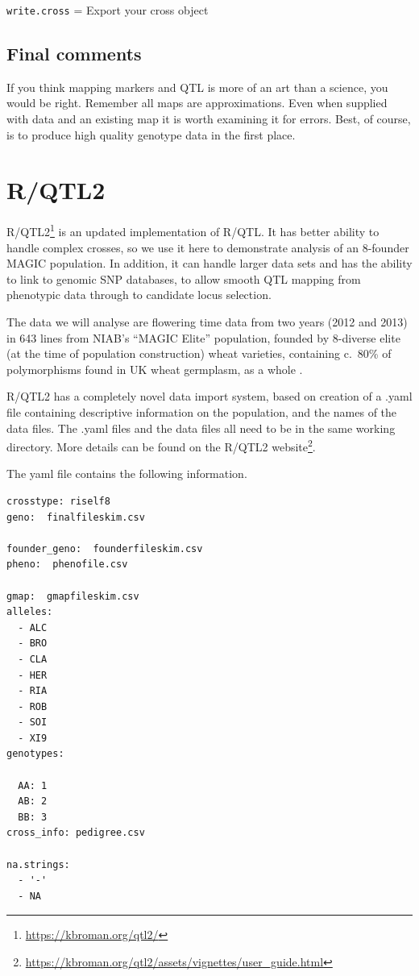 \documentclass[
]{book}
\renewcommand{\href}[2]{#2\footnote{\url{#1}}}
\begin{document}
\texttt{write.cross} = Export your cross object

\hypertarget{final-comments}{%
\subsection{Final comments}\label{final-comments}}

If you think mapping markers and QTL is more of an art than a science, you would be right. Remember all maps are approximations. Even when supplied with data and an existing map it is worth examining it for errors. Best, of course, is to produce high quality genotype data in the first place.

\hypertarget{rqtl2}{%
\section{R/QTL2}\label{rqtl2}}

\href{https://kbroman.org/qtl2/}{R/QTL2} is an updated implementation of R/QTL. It has better ability to handle complex crosses, so we use it here to demonstrate analysis of an 8-founder MAGIC population. In addition, it can handle larger data sets and has the ability to link to genomic SNP databases, to allow smooth QTL mapping from phenotypic data through to candidate locus selection.

The data we will analyse are flowering time data from two years (2012 and 2013) in 643 lines from NIAB's ``MAGIC Elite'' population, founded by 8-diverse elite (at the time of population construction) wheat varieties, containing c.~80\% of polymorphisms found in UK wheat germplasm, as a whole \citep{Gardner_2016}.

R/QTL2 has a completely novel data import system, based on creation of a .yaml file containing descriptive information on the population, and the names of the data files. The .yaml files and the data files all need to be in the same working directory. More details can be found on the R/QTL2 \href{https://kbroman.org/qtl2/assets/vignettes/user_guide.html}{website}.

The yaml file contains the following information.

\begin{verbatim}
crosstype: riself8      
geno:  finalfileskim.csv

founder_geno:  founderfileskim.csv
pheno:  phenofile.csv

gmap:  gmapfileskim.csv
alleles:
  - ALC
  - BRO
  - CLA
  - HER
  - RIA
  - ROB
  - SOI
  - XI9
genotypes:

  AA: 1
  AB: 2
  BB: 3
cross_info: pedigree.csv

na.strings:
  - '-'
  - NA
\end{verbatim}
\end{document}
